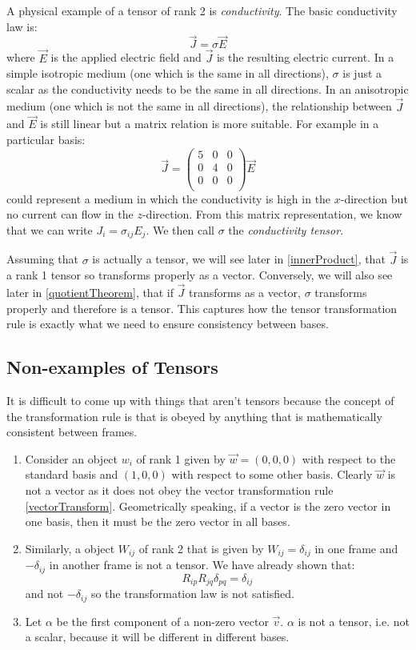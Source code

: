 \documentclass[../main.tex]{subfiles}
\begin{document}
\begin{example}
  A physical example of a tensor of rank 2 is \textit{conductivity}. \label{conductivityTensor}
  The basic conductivity law is:
  \[
    \vec{J} = \sigma \vec{E}
  \]
  where $\vec{E}$ is the applied electric field and $\vec{J}$ is the resulting electric current.
  In a simple isotropic medium (one which is the same in all directions), $\sigma$ is just a scalar as the conductivity needs to be the same in all directions.
  In an anisotropic medium (one which is not the same in all directions), the relationship between $\vec{J}$ and $\vec{E}$ is still linear but a matrix relation is more suitable.
  For example in a particular basis:
  \[
    \vec{J} = \begin{pmatrix}
    5 & 0 & 0 \\
    0 & 4 & 0 \\
    0 & 0 & 0 \\
    \end{pmatrix}\vec{E}
  \]
  could represent a medium in which the conductivity is high in the $x$-direction but no current can flow in the $z$-direction.
  From this matrix representation, we know that we can write $J_i = \sigma_{i j}E_j$.
  We then call $\sigma$ the \textit{conductivity tensor}.

  Assuming that $\sigma$ is actually a tensor, we will see later in \cref{innerProduct}, that $\vec{J}$ is a rank 1 tensor so transforms properly as a vector.
  Conversely, we will also see later in \cref{quotientTheorem}, that if $\vec{J}$ transforms as a vector, $\sigma$ transforms properly and therefore is a tensor.
  This captures how the tensor transformation rule is exactly what we need to ensure consistency between bases.
\end{example}
\subsection{Non-examples of Tensors}
It is difficult to come up with things that aren't tensors because the concept of the transformation rule is that is obeyed by anything that is mathematically consistent between frames.
\begin{enumerate}
  \item Consider an object $w_i$ of rank 1 given by $\vec{w} = (0, 0, 0)$ with respect to the standard basis and $(1, 0, 0)$ with respect to some other basis.
    Clearly $\vec{w}$ is not a vector as it does not obey the vector transformation rule \cref{vectorTransform}.
    Geometrically speaking, if a vector is the zero vector in one basis, then it must be the zero vector in all bases.
  \item Similarly, a object $W_{i j}$ of rank 2 that is given by $W_{i j} = \delta_{i j}$ in one frame and $-\delta_{i j}$ in another frame is not a tensor.
    We have already shown that:
    \[
      R_{i p}R_{j q}\delta_{p q} = \delta_{i j}
    \]
    and not $- \delta_{i j}$ so the transformation law is not satisfied.
  \item Let $\alpha$ be the first component of a non-zero vector $\vec{v}$.
    $\alpha$ is not a tensor, i.e. not a scalar, because it will be different in different bases.
\end{enumerate}
\end{document}
